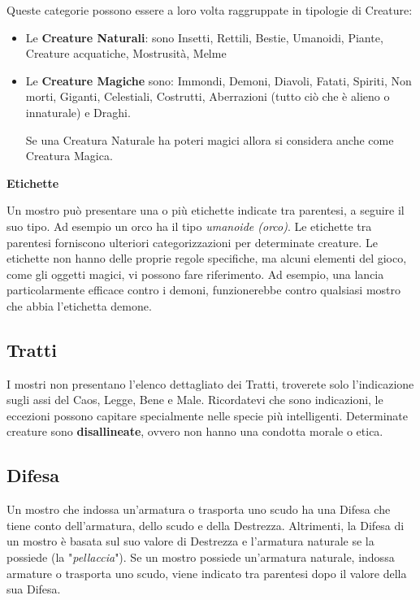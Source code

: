\begin{multicols}{2}
\medskip

Queste categorie possono essere a loro volta raggruppate in tipologie di Creature:
\smallskip
\begin{itemize}[leftmargin=*] \setlength{\itemsep}{0pt}
\item
Le \textbf{Creature Naturali}: sono Insetti, Rettili, Bestie, Umanoidi, Piante, Creature acquatiche, Mostrusità, Melme
\item
Le \textbf{Creature Magiche} sono: Immondi, Demoni, Diavoli, Fatati, Spiriti, Non morti, Giganti, Celestiali, Costrutti, Aberrazioni (tutto ciò che è alieno o innaturale) e Draghi.

Se una Creatura Naturale ha poteri magici allora si considera anche come Creatura Magica.
\end{itemize}

\medskip\textbf{Etichette}

Un mostro può presentare una o più etichette indicate tra parentesi, a seguire il suo tipo. Ad esempio un orco ha il tipo \emph{umanoide (orco)}. Le etichette tra parentesi forniscono ulteriori categorizzazioni per determinate creature. Le etichette non hanno delle proprie regole specifiche, ma alcuni elementi del gioco, come gli oggetti magici, vi possono fare riferimento. Ad esempio, una lancia particolarmente efficace contro i demoni, funzionerebbe contro qualsiasi mostro che abbia l'etichetta demone.

\subsection{Tratti}

I mostri non presentano l'elenco dettagliato dei Tratti, troverete solo l'indicazione sugli assi del Caos, Legge, Bene e Male. Ricordatevi che sono indicazioni, le eccezioni possono capitare specialmente nelle specie più intelligenti.
Determinate creature sono \textbf{disallineate}, ovvero non hanno una condotta morale o etica.

\subsection{Difesa}

Un mostro che indossa un'armatura o trasporta uno scudo ha una Difesa che tiene conto dell'armatura, dello scudo e della Destrezza. Altrimenti, la Difesa di un mostro è basata sul suo valore di Destrezza e l'armatura naturale se la possiede (la "\emph{pellaccia}"). Se un mostro possiede un'armatura naturale, indossa armature o trasporta uno scudo, viene indicato tra parentesi dopo il valore della sua Difesa.


\end{multicols}
